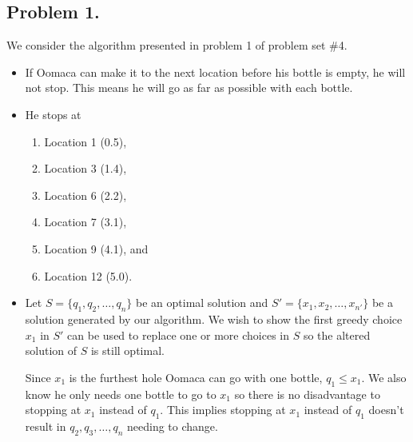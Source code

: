 \documentclass[11pt, letterpaper, titlepage]{article}
\begin{document}
\onehalfspacing

\subsection*{Problem 1.}
We consider the algorithm presented in problem 1 of problem set \#4.
\begin{itemize}
    \item If Oomaca can make it to the next location before his bottle is empty, he will not stop. This means he will go as far as possible with each bottle.
    
    \item He stops at
    \begin{enumerate}
        \item Location 1 (0.5),
        \item Location 3 (1.4),
        \item Location 6 (2.2),
        \item Location 7 (3.1),
        \item Location 9 (4.1), and
        \item Location 12 (5.0).
    \end{enumerate}

    \item Let $S = \{ q_1, q_2, \ldots, q_n \}$ be an optimal solution and $S' = \{ x_1, x_2, \ldots, x_{n'} \}$ be a solution generated by our algorithm. We wish to show the first greedy choice $x_1$ in $S'$ can be used to replace one or more choices in $S$ so the altered solution of $S$ is still optimal. 
    
    Since $x_1$ is the furthest hole Oomaca can go with one bottle, $q_1 \leq x_1$. We also know he only needs one bottle to go to $x_1$ so there is no disadvantage to stopping at $x_1$ instead of $q_1$. This implies stopping at $x_1$ instead of $q_1$ doesn't result in $q_2, q_3, \ldots, q_n$ needing to change.
\end{itemize}

\newpage
\end{document}
